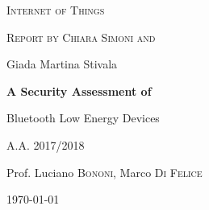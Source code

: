 \documentclass[12pt,a4paper]{report}
\begin{document}
	\begin{titlepage}
		\centering
			{\scshape\LARGE Internet of Things \par}
			\vspace{1cm}
			{\scshape\Large Report by Chiara Simoni and
				
				Giada Martina Stivala \par}
			\vspace{1.5cm}
			{\huge\bfseries A Security Assessment of
				
				Bluetooth Low Energy Devices\par}
			\vspace{2cm} \par
		\vfill
		A.A. 2017/2018\par
		Prof. Luciano \textsc{Bononi}, Marco \textsc{Di Felice}
		\vfill
		
		{\large \today\par}
	\end{titlepage}
\end{document}
